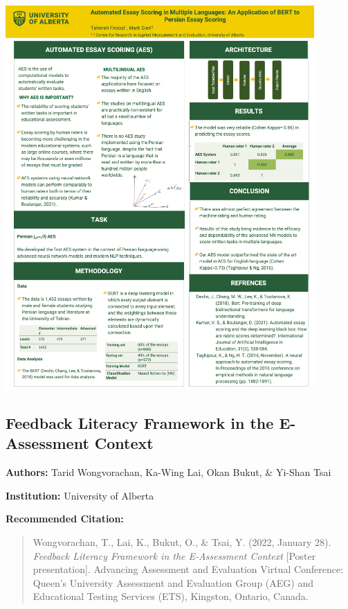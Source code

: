 \documentclass[
]{book}
\begin{document}
\includegraphics{Content/TM.png}

\newpage

\hypertarget{feedback-literacy-framework-in-the-e-assessment-context}{%
\subsection{Feedback Literacy Framework in the E-Assessment Context}\label{feedback-literacy-framework-in-the-e-assessment-context}}

\textbf{Authors:} Tarid Wongvorachan, Ka-Wing Lai, Okan Bukut, \& Yi-Shan Tsai

\textbf{Institution:} University of Alberta

\textbf{Recommended Citation:}

\begin{quote}
Wongvorachan, T., Lai, K., Bukut, O., \& Tsai, Y. (2022, January 28). \emph{Feedback Literacy Framework in the E-Assessment Context} {[}Poster presentation{]}. Advancing Assessment and Evaluation Virtual Conference: Queen's University Assessment and Evaluation Group (AEG) and Educational Testing Services (ETS), Kingston, Ontario, Canada.
\end{quote}
\end{document}
